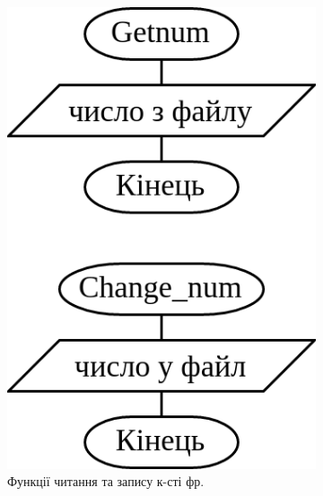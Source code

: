 \documentclass[12pt]{extreport}
\begin{document}
\begin{figure}[h]
	\begin{subfigure}[b]{.19\textwidth}
	\centering
		\includegraphics[width=\textwidth]{fch2/getnum.png}
		\caption{Функції читання та запису к-сті фр.}
	\end{subfigure}
	\hfill
	\begin{subfigure}[b]{.24\textwidth}
	\centering

\end{subfigure}
\end{figure}
\end{document}

